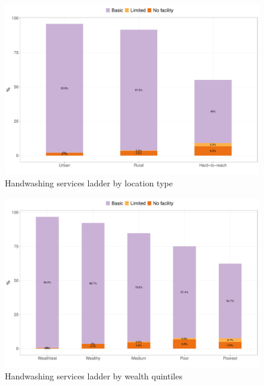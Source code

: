 \documentclass[12pt,a4paper]{article}
\begin{document}
\newpage

\begin{figure}[H]

{\centering \includegraphics{kayinReport_files/figure-latex/handwashing1plot-1} 

}

\caption{Handwashing services ladder by location type}\label{fig:handwashing1plot}
\end{figure}

\begin{figure}[H]

{\centering \includegraphics{kayinReport_files/figure-latex/handwashing2plot-1} 

}

\caption{Handwashing services ladder by wealth quintiles}\label{fig:handwashing2plot}
\end{figure}
\end{document}
